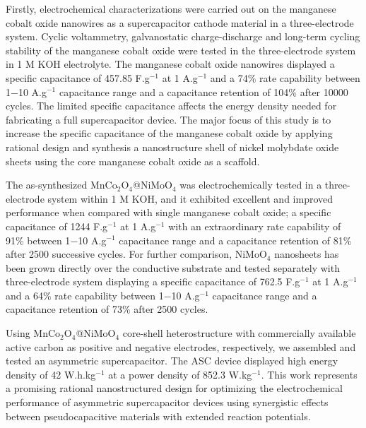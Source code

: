 \documentclass[reprint,amsmath,amssymb,aps,floatfix,
]{revtex4-2}
\begin{document}
Firstly, electrochemical characterizations were carried out on the manganese cobalt oxide nanowires as a supercapacitor cathode material in a three-electrode system. Cyclic voltammetry, galvanostatic charge-discharge and long-term cycling stability of the manganese cobalt oxide were tested in the three-electrode system in 1 M KOH electrolyte. The manganese cobalt oxide nanowires displayed a specific capacitance of 457.85 F.g$^{-1}$ at 1 A.g$^{-1}$ and a 74\% rate capability between 1$-$10 A.g$^{-1}$ capacitance range and a capacitance retention of 104\% after 10000 cycles. The limited specific capacitance affects the energy density needed for fabricating a full supercapacitor device. The major focus of this study is to increase the specific capacitance of the manganese cobalt oxide by applying rational design and synthesis a nanostructure shell of nickel molybdate oxide sheets using the core manganese cobalt oxide as a scaffold.

The as-synthesized MnCo$_2$O$_4$@NiMoO$_4$ was electrochemically tested in a three-electrode system within 1 M KOH, and it exhibited excellent and improved performance when compared with single manganese cobalt oxide; a specific capacitance of 1244 F.g$^{-1}$ at 1 A.g$^{-1}$ with an extraordinary rate capability of 91\% between 1$-$10 A.g$^{-1}$ capacitance range and a capacitance retention of 81\% after 2500 successive cycles. For further comparison, NiMoO$_4$ nanosheets has been grown directly over the conductive substrate and tested separately with three-electrode system displaying a specific capacitance of 762.5 F.g$^{-1}$ at 1 A.g$^{-1}$ and a 64\% rate capability between 1$-$10 A.g$^{-1}$ capacitance range and a capacitance retention of 73\% after 2500 cycles.

Using MnCo$_2$O$_4$@NiMoO$_4$ core-shell heterostructure with commercially available active carbon as positive and negative electrodes, respectively, we assembled and tested an asymmetric supercapacitor. The ASC device displayed high energy density of 42 W.h.kg$^{-1}$ at a power density of 852.3 W.kg$^{-1}$. This work represents a promising rational nanostructured design for optimizing the electrochemical performance of asymmetric supercapacitor devices using synergistic effects between pseudocapacitive materials with extended reaction potentials.
\begin{center}
\end{center}
\end{document}
